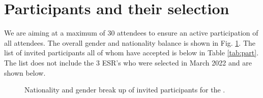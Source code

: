 \section{Participants and their selection}

We are aiming at a maximum of 30 attendees to ensure an active
participation of all attendees. The overall gender and nationality
balance is shown in Fig. \ref{fig:country}. The list of invited
participants all of whom have accepted is below in Table
\ref{tab:part}. The list does not include the 3 ESR's who were
selected in March 2022 and are shown below.

\begin{figure}[!hb]
  \centering 
  \caption{Nationality and gender break up of invited participants for
    the \sympe.}
  \label{fig:country}
\end{figure}







